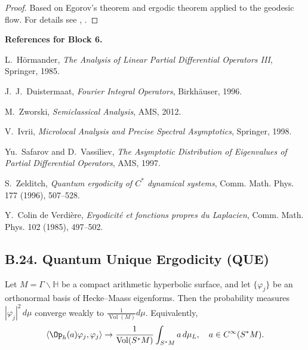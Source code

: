 \begin{proof}
Based on Egorov’s theorem and ergodic theorem applied to the geodesic flow. For details see \cite{ZelditchQE}, \cite{CdV}.
\end{proof}

\medskip

\noindent\textbf{References for Block 6.}
\begin{thebibliography}{99}

L.~Hörmander, \emph{The Analysis of Linear Partial Differential Operators III}, Springer, 1985.

J.~J.~Duistermaat, \emph{Fourier Integral Operators}, Birkhäuser, 1996.

M.~Zworski, \emph{Semiclassical Analysis}, AMS, 2012.

V.~Ivrii, \emph{Microlocal Analysis and Precise Spectral Asymptotics}, Springer, 1998.

Yu.~Safarov and D.~Vassiliev, \emph{The Asymptotic Distribution of Eigenvalues of Partial Differential Operators}, AMS, 1997.

S.~Zelditch, \emph{Quantum ergodicity of $C^*$ dynamical systems}, Comm. Math. Phys. 177 (1996), 507–528.

Y.~Colin de Verdière, \emph{Ergodicité et fonctions propres du Laplacien}, Comm. Math. Phys. 102 (1985), 497–502.

\end{thebibliography}


\subsection*{B.24. Quantum Unique Ergodicity (QUE)}
\label{appB:QUE}

\begin{theorem}
\label{thm:QUE}
Let $M=\Gamma\backslash \mathbb{H}$ be a compact arithmetic hyperbolic surface, and let $\{\varphi_j\}$ be an orthonormal basis of Hecke–Maass eigenforms. Then the probability measures $|\varphi_j|^2\,d\mu$ converge weakly to $\tfrac{1}{\operatorname{Vol}(M)}d\mu$. Equivalently,
\[
\langle \Op_h(a)\varphi_j, \varphi_j\rangle \to \frac{1}{\operatorname{Vol}(S^*M)}\int_{S^*M}a\,d\mu_L, \quad a\in C^\infty(S^*M).
\]
\end{theorem}

